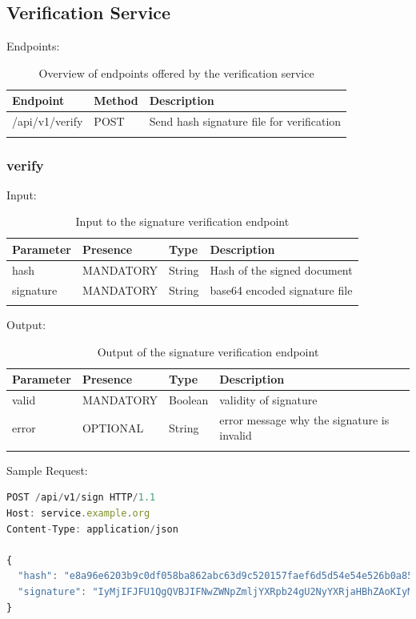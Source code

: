 \subsection{Verification Service}
Endpoints:

\begin{longtable}{|l|l|l|}
	\hline
	\textbf{Endpoint} & \textbf{Method} & \textbf{Description} \\ \hline
	/api/v1/verify & POST & Send hash signature file for verification \\ \hline
	\caption{Overview of endpoints offered by the verification service}
\end{longtable}

\subsubsection{verify}
Input:

\begin{longtable}{|l|l|l|l|}
	\hline
	\textbf{Parameter} & \textbf{Presence} & \textbf{Type} & \textbf{Description} \\ \hline
	hash & MANDATORY & String & Hash of the signed document \\ \hline
	signature & MANDATORY & String & base64 encoded signature file \\ \hline
    \caption{Input to the signature verification endpoint}
\end{longtable}

Output:

\begin{longtable}{|l|l|l|l|}
	\hline
	\textbf{Parameter} & \textbf{Presence} & \textbf{Type} & \textbf{Description} \\ \hline
	valid & MANDATORY & Boolean & validity of signature \\ \hline
	error & OPTIONAL & String & error message why the signature is invalid \\ \hline
	\caption{Output of the signature verification endpoint}
\end{longtable}

Sample Request:
\begin{lstlisting}[caption={sign request}, captionpos=b, language=JavaScript, label={lst:verifyrequest}]
POST /api/v1/sign HTTP/1.1
Host: service.example.org
Content-Type: application/json

{
  "hash": "e8a96e6203b9c0df058ba862abc63d9c520157faef6d5d54e54e526b0a85b2be",
  "signature": "IyMjIFJFU1QgQVBJIFNwZWNpZmljYXRpb24gU2NyYXRjaHBhZAoKIyMjIyBQcmUtQXV0aCBlbmRw...b2ludCAKIyMjIyMgRW5kcG9pbnQKYGBgUE9TVCAvYXBpL3YxL3NpZ25gYGAK"
}
\end{lstlisting}

